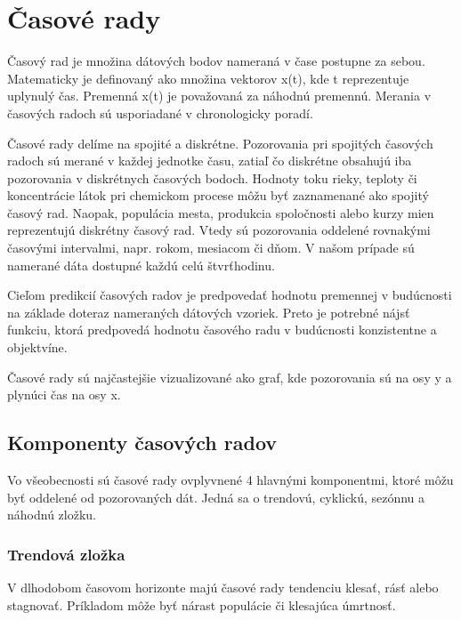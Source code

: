 \documentclass[12pt,oneside,slovak,a4paper]{book}
\begin{document}

\chapter{Časové rady}
Časový rad je množina dátových bodov nameraná v čase postupne za sebou.
Matematicky je definovaný ako množina vektorov x(t), kde t reprezentuje
uplynulý čas. Premenná x(t) je považovaná za náhodnú premennú.
Merania v časových radoch sú usporiadané v chronologicky
poradí\cite{Agrawal2013}.

Časové rady delíme na spojité a diskrétne. Pozorovania pri spojitých časových
radoch sú merané v každej jednotke času, zatiaľ čo diskrétne obsahujú iba
pozorovania v diskrétnych časových bodoch. Hodnoty toku rieky, teploty
či koncentrácie látok pri chemickom procese môžu byť zaznamenané ako spojitý
časový rad. Naopak, populácia mesta, produkcia spoločnosti alebo kurzy mien
reprezentujú diskrétny časový rad. Vtedy sú pozorovania oddelené rovnakými
časovými intervalmi, napr. rokom, mesiacom či dňom. V našom prípade sú namerané
dáta dostupné každú celú štvrťhodinu\cite{Agrawal2013}.

Cieľom predikcií časových radov je predpovedať hodnotu premennej v budúcnosti
na základe doteraz nameraných dátových vzoriek. Preto je potrebné nájsť funkciu,
ktorá predpovedá hodnotu časového radu v budúcnosti konzistentne
a objektvíne\cite{Sapankevych2009}.

Časové rady sú najčastejšie vizualizované ako graf, kde pozorovania sú na
osy y a plynúci čas na osy x.

\section{Komponenty časových radov}
Vo všeobecnosti sú časové rady ovplyvnené 4 hlavnými komponentmi, ktoré môžu
byť oddelené od pozorovaných dát. Jedná sa o trendovú, cyklickú, sezónnu
a náhodnú zložku\cite{Agrawal2013}.

\subsection{Trendová zložka}
V dlhodobom časovom horizonte majú časové rady tendenciu klesať, rásť alebo
stagnovať. Príkladom môže byť nárast populácie či klesajúca
úmrtnosť\cite{Agrawal2013}.
\end{document}
